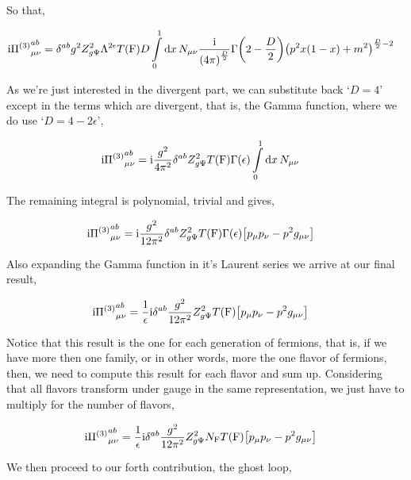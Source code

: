 So that,

\begin{align}
    \textnormal{i} {\Pi^{\qty(3)}}^{ab}_{\mu\nu}&=\delta^{ab}g^2Z_{g\Psi}^2\Lambda^{2\epsilon}T\qty(\textnormal{F})D\int\limits_0^1\dd{x}N_{\mu\nu}\frac{\textnormal{i}}{\qty(4\pi)^{\frac D2}}\Gamma\qty(2-\frac D2)\qty(p^2x\qty(1-x) +m^2)^{\frac D2-2}\nonumber
\end{align}

As we're just interested in the divergent part, we can substitute back `$D=4$' except in the terms which are divergent,
that is, the Gamma function, where we do use `$D=4-2\epsilon$',

\begin{align}
    \textnormal{i} {\Pi^{\qty(3)}}^{ab}_{\mu\nu}&=\textnormal{i}\frac{g^2}{4\pi^2}\delta^{ab}Z_{g\Psi}^2T\qty(\textnormal{F})\Gamma\qty(\epsilon)\int\limits_0^1\dd{x}N_{\mu\nu}\nonumber
\end{align}

The remaining integral is polynomial, trivial and gives,

\begin{align}
    \textnormal{i} {\Pi^{\qty(3)}}^{ab}_{\mu\nu}&=\textnormal{i}\frac{g^2}{12\pi^2}\delta^{ab}Z_{g\Psi}^2T\qty(\textnormal{F})\Gamma\qty(\epsilon)\qty[p_\mu p_\nu-p^2g_{\mu\nu}]\nonumber
\end{align}

Also expanding the Gamma function in it's Laurent series we arrive at our final result,

\begin{align}
    \textnormal{i} {\Pi^{\qty(3)}}^{ab}_{\mu\nu}&=\frac1\epsilon\textnormal{i}\delta^{ab}\frac{g^2}{12\pi^2}Z_{g\Psi}^2T\qty(\textnormal{F})\qty[p_\mu p_\nu-p^2g_{\mu\nu}]\nonumber
\end{align}

Notice that this result is the one for each generation of fermions, that is, if we have more then one family, or in 
other words, more the one flavor of fermions, then, we need to compute this result for each flavor and sum up. 
Considering that all flavors transform under gauge in the same representation, we just have to multiply for the 
number of flavors,

\begin{align}
    \textnormal{i} {\Pi^{\qty(3)}}^{ab}_{\mu\nu}&=\frac1\epsilon\textnormal{i}\delta^{ab}\frac{g^2}{12\pi^2}Z_{g\Psi}^2N_{\textnormal{F}}T\qty(\textnormal{F})\qty[p_\mu p_\nu-p^2g_{\mu\nu}]\nonumber
\end{align}

We then proceed to our forth contribution, the ghost loop,

